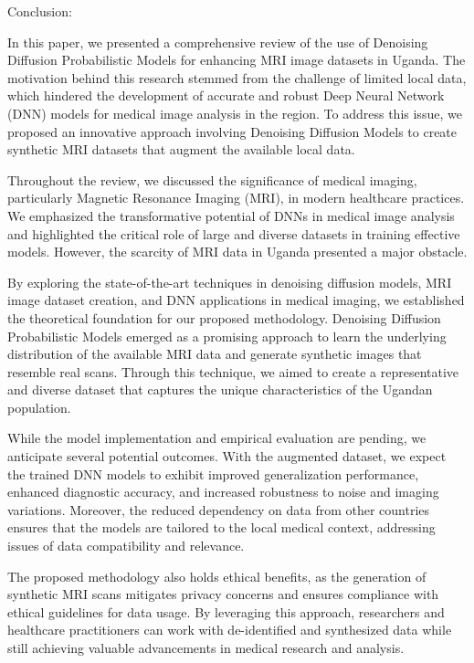 Conclusion:

In this paper, we presented a comprehensive review of the use of Denoising Diffusion Probabilistic Models for enhancing MRI image datasets in Uganda. The motivation behind this research stemmed from the challenge of limited local data, which hindered the development of accurate and robust Deep Neural Network (DNN) models for medical image analysis in the region. To address this issue, we proposed an innovative approach involving Denoising Diffusion Models to create synthetic MRI datasets that augment the available local data.

Throughout the review, we discussed the significance of medical imaging, particularly Magnetic Resonance Imaging (MRI), in modern healthcare practices. We emphasized the transformative potential of DNNs in medical image analysis and highlighted the critical role of large and diverse datasets in training effective models. However, the scarcity of MRI data in Uganda presented a major obstacle.

By exploring the state-of-the-art techniques in denoising diffusion models, MRI image dataset creation, and DNN applications in medical imaging, we established the theoretical foundation for our proposed methodology. Denoising Diffusion Probabilistic Models emerged as a promising approach to learn the underlying distribution of the available MRI data and generate synthetic images that resemble real scans. Through this technique, we aimed to create a representative and diverse dataset that captures the unique characteristics of the Ugandan population.

While the model implementation and empirical evaluation are pending, we anticipate several potential outcomes. With the augmented dataset, we expect the trained DNN models to exhibit improved generalization performance, enhanced diagnostic accuracy, and increased robustness to noise and imaging variations. Moreover, the reduced dependency on data from other countries ensures that the models are tailored to the local medical context, addressing issues of data compatibility and relevance.

The proposed methodology also holds ethical benefits, as the generation of synthetic MRI scans mitigates privacy concerns and ensures compliance with ethical guidelines for data usage. By leveraging this approach, researchers and healthcare practitioners can work with de-identified and synthesized data while still achieving valuable advancements in medical research and analysis.

